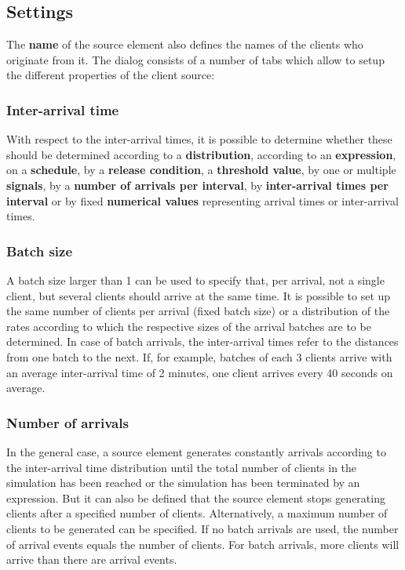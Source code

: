 \subsection*{Settings}

The \textbf{name} of the source element also defines the names of the clients who originate from it.
The dialog consists of a number of tabs which allow to setup the different properties of the client source:

\subsubsection*{Inter-arrival time}

With respect to the inter-arrival times, it is possible to determine whether these
should be determined according to a \textbf{distribution}, according to an \textbf{expression},
on a \textbf{schedule}, by a \textbf{release condition}, a \textbf{threshold value}, by
one or multiple \textbf{signals}, by a \textbf{number of arrivals per interval}, by
\textbf{inter-arrival times per interval} or by fixed \textbf{numerical values}
representing arrival times or inter-arrival times.

\subsubsection*{Batch size}

A batch size larger than 1 can be used to specify that, per arrival, not a single client,
but several clients should arrive at the same time. It is possible to set up the same number
of clients per arrival (fixed batch size) or a distribution of the rates according to which
the respective sizes of the arrival batches are to be determined.
In case of batch arrivals, the inter-arrival times refer to the distances from one batch to the next.
If, for example, batches of each 3 clients arrive with an average inter-arrival time of 2 minutes,
one client arrives every 40 seconds on average.

\subsubsection*{Number of arrivals}

In the general case, a source element generates constantly arrivals according to the
inter-arrival time distribution until the total number of clients in the simulation has been reached
or the simulation has been terminated by an expression. But it can also be defined that the
source element stops generating clients after a specified number of clients.
Alternatively, a maximum number of clients to be generated can be specified.
If no batch arrivals are used, the number of arrival events equals the
number of clients. For batch arrivals, more clients will arrive than there are arrival events.

